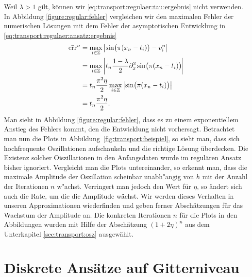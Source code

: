 Weil $\lambda > 1$ gilt, können wir \eqref{eq:transport:regulaer:tau:ergebnis} nicht verwenden.
In Abbildung \ref{figure:regular:fehler} vergleichen wir den maximalen Fehler der numerischen Lösungen mit dem Fehler der asymptotischen Entwicklung in \eqref{eq:transport:regulaer:ansatz:ergebnis}
\begin{align}\label{eq:transport:regulaer:fehler}
\begin{split}
\bar {\operatorname{err}}^n &= \max_{i \in \mathbb Z} \left|  \sin\bigl( \pi (x_n - t_i) \bigr) - v^n_i  \right|\\
&= \max_{i \in \mathbb Z} \left|  t_n \frac{1-\lambda}{2} \partial^2_x \sin\bigl( \pi (x_n - t_i) \bigr)  \right|\\
&=  t_n \frac{\pi^2 \eta}{2} \max_{i \in \mathbb Z} \left|  \sin\bigl( \pi (x_n - t_i) \bigr)  \right|\\
&= t_n \frac{\pi^2 \eta}{2}.
\end{split}
\end{align}
Man sieht in Abbildung \ref{figure:regular:fehler}, dass es zu einem exponentiellem Anstieg des Fehlers kommt, den die Entwicklung nicht vorhersagt.
Betrachtet man nun die Plots in Abbildung~\ref{fig:transport:beispiel}, so sieht man, dass sich hochfrequente Oszillationen aufschaukeln und die richtige Lösung überdecken.
Die Existenz solcher Oiszillationen in den Anfangsdaten wurde im regulären Ansatz bisher ignoriert.
Vergleicht man die Plots untereinander, so erkennt man, dass die maximale Amplitude der Oszillation scheinbar unabh"angig von $h$ mit der Anzahl der Iterationen $n$ w"achst.
Verringert man jedoch den Wert für $\eta$, so ändert sich auch die Rate, um die die Amplitude wächst.
Wir werden dieses Verhalten in unseren Approximationen wiederfinden und geben ferner Abschätzungen für das Wachstum der Amplitude an.
Die konkreten Iterationen $n$ für die Plots in den Abbildungen wurden mit Hilfe der Abschätzung $(1 + 2 \eta)^n$ aus dem Unterkapitel \ref{sec:transport:osz} ausgewählt.


\section {Diskrete Ansätze auf Gitterniveau} \label{sec:transport:diskret}

